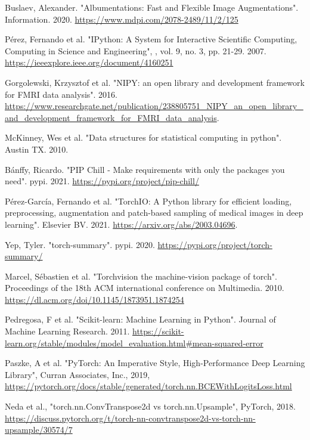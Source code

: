 \documentclass[11pt, fleqn, titlepage]{article}
\newcommand{\1}[1]{\mathds{1}\left[#1\right]}
\begin{document}
\begin{thebibliography}{9}
		 Buslaev, Alexander. "Albumentations: Fast and Flexible Image Augmentations". Information. 2020. \url{https://www.mdpi.com/2078-2489/11/2/125}
		
		 Pérez, Fernando et al. "IPython: A System for Interactive Scientific Computing, Computing in Science and Engineering", , vol. 9, no. 3, pp. 21-29. 2007. \url{https://ieeexplore.ieee.org/document/4160251}
		
		 Gorgolewski, Krzysztof et al. "NIPY: an open library and development framework for FMRI data analysis". 2016. \url{https://www.researchgate.net/publication/238805751\_NIPY\_an\_open\_library\_and\_development\_framework\_for\_FMRI\_data\_analysis}.
		
		 McKinney, Wes et al. "Data structures for statistical computing in python". Austin TX. 2010.
		
		 Bánffy, Ricardo. "PIP Chill - Make requirements with only the packages you need". pypi. 2021. \url{https://pypi.org/project/pip-chill/}
		
		 Pérez-García, Fernando et al. "TorchIO: A Python library for efficient loading, preprocessing, augmentation and patch-based sampling of medical images in deep learning". Elsevier BV. 2021. \url{https://arxiv.org/abs/2003.04696}.	
		
		  Yep, Tyler. "torch-summary". pypi. 2020. \url{https://pypi.org/project/torch-summary/}
		
		 Marcel, Sébastien et al. "Torchvision the machine-vision package of torch". Proceedings of the 18th ACM international conference on Multimedia. 2010. \url{https://dl.acm.org/doi/10.1145/1873951.1874254}
		
		 Pedregosa, F et al. "Scikit-learn: Machine Learning in Python". Journal of Machine Learning Research. 2011. \url{https://scikit-learn.org/stable/modules/model_evaluation.html#mean-squared-error}
		
		 Paszke, A et al. "PyTorch: An Imperative Style, High-Performance Deep Learning Library", Curran Associates, Inc., 2019, \url{https://pytorch.org/docs/stable/generated/torch.nn.BCEWithLogitsLoss.html}
		
		 Neda et al., "torch.nn.ConvTranspose2d vs torch.nn.Upsample", PyTorch, 2018. \url{https://discuss.pytorch.org/t/torch-nn-convtranspose2d-vs-torch-nn-upsample/30574/7}
		

\end{thebibliography}
\end{document}

